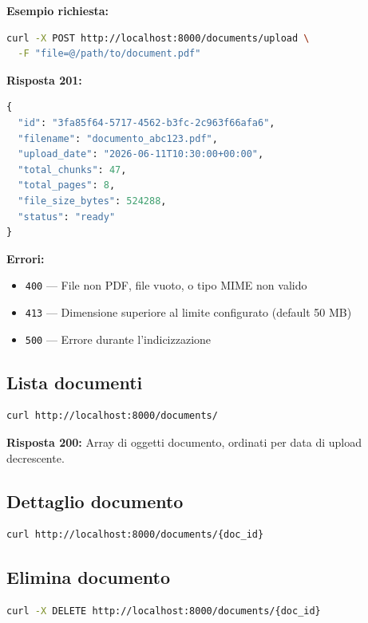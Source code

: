 \textbf{Esempio richiesta:}
\begin{lstlisting}[language=bash]
curl -X POST http://localhost:8000/documents/upload \
  -F "file=@/path/to/document.pdf"
\end{lstlisting}

\textbf{Risposta 201:}
\begin{lstlisting}[language=Python]
{
  "id": "3fa85f64-5717-4562-b3fc-2c963f66afa6",
  "filename": "documento_abc123.pdf",
  "upload_date": "2026-06-11T10:30:00+00:00",
  "total_chunks": 47,
  "total_pages": 8,
  "file_size_bytes": 524288,
  "status": "ready"
}
\end{lstlisting}

\textbf{Errori:}
\begin{itemize}
  \item \texttt{400} — File non PDF, file vuoto, o tipo MIME non valido
  \item \texttt{413} — Dimensione superiore al limite configurato (default 50 MB)
  \item \texttt{500} — Errore durante l'indicizzazione
\end{itemize}

\subsection{Lista documenti}

\begin{lstlisting}[language=bash]
curl http://localhost:8000/documents/
\end{lstlisting}

\textbf{Risposta 200:} Array di oggetti documento, ordinati per data di upload decrescente.

\subsection{Dettaglio documento}

\begin{lstlisting}[language=bash]
curl http://localhost:8000/documents/{doc_id}
\end{lstlisting}

\subsection{Elimina documento}

\begin{lstlisting}[language=bash]
curl -X DELETE http://localhost:8000/documents/{doc_id}
\end{lstlisting}

